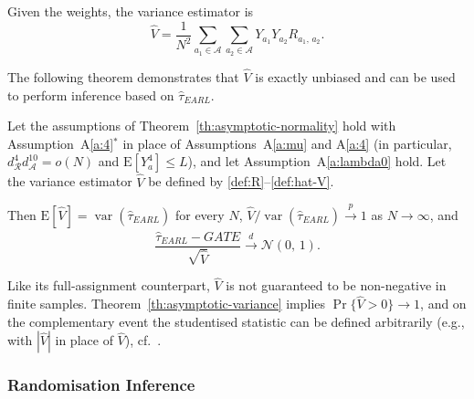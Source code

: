 \documentclass[sigconf]{acmart}
\newcounter{assumption}
\newcommand{\E}{\mathrm E}
\DeclareMathOperator{\var}{var}
\begin{document}
Given the weights, the variance estimator is
\begin{equation}\label{def:hat-V}
    \hat V = \frac 1 {N^2} \sum_{a_1\in\mathcal A}\sum_{a_2\in\mathcal A} Y_{a_1}Y_{a_2}R_{a_1,\,a_2}.
\end{equation}

The following theorem demonstrates that $\hat V$ is exactly unbiased and can be used to perform inference based on $\hat\tau_{EARL}^{\phantom{1}}$.

\begin{theorem}\label{th:asymptotic-variance}
    Let the assumptions of Theorem~\ref{th:asymptotic-normality} hold with Assumption~A\ref{a:4}$^*$ in place of Assumptions~A\ref{a:mu} and A\ref{a:4} (in particular, $d^{4}_{\mathcal{R}}d^{10}_{\mathcal{A}}=o(N)$ and $\E[Y_a^4]\le L$), and let Assumption~A\ref{a:lambda0} hold. Let the variance estimator $\hat V$ be defined by \eqref{def:R}--\eqref{def:hat-V}.

    Then $\E[\hat V] = \var(\hat\tau^{\phantom{1}}_{EARL})$ for every $N$, $\hat V / \var(\hat\tau^{\phantom{1}}_{EARL})\stackrel{p}{\to} 1$ as $N\to\infty$, and
    $$
        \frac{\hat\tau^{\phantom{1}}_{EARL} - GATE}{\sqrt{\hat V}} \stackrel{d}{\to} \mathcal N(0,\,1).
    $$
\end{theorem}

Like its full-assignment counterpart, $\hat V$ is not guaranteed to be non-negative in finite samples. Theorem~\ref{th:asymptotic-variance} implies $\Pr\{\hat V>0\}\to1$, and on the complementary event the studentised statistic can be defined arbitrarily (e.g., with $|\hat V|$ in place of $\hat V$), cf.\ \cite{harshaw2023erl}.

\subsubsection{Randomisation Inference}\label{subsubsec:ri}
\end{document}
